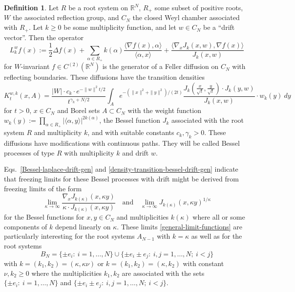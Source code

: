 \documentclass[reqno]{amsart}
\theoremstyle{plain}
\theoremstyle{definition}
\newtheorem{definition}[theorem]{Definition}
\numberwithin{equation}{section}
\begin{document}
\begin{definition}\label{def-bessel-p-drift}
  Let $R$ be a root system on $\mathbb R^N$, $R_+$ some subset of positive roots, $W$ the associated reflection group,
  and $C_N$ the closed Weyl chamber associated with $R_+$. Let $ k\ge0$ be some multiplicity function, and
 let $w\in C_N$ be a ``drift vector''. Then the operator
   \begin{equation}\label{Bessel-laplace-drift-gen}
  L_k^w f(x):= \frac{1}{2}\Delta f(x)  + \sum_{\alpha\in R_+}
k(\alpha)
\frac{\langle\nabla f(x),\alpha\rangle}{\langle\alpha ,x\rangle}+\frac{\langle \nabla_x J_k(x,w), \nabla f(x)\rangle }{J_k(x,w)}
   \end{equation}
   for $W$-invariant $f\in C^{(2)}(\mathbb R^N)$ is the generator of a Feller diffusion on $C_N$ with reflecting boundaries.
   These diffusions have the transition densities
   \begin{equation}\label{density-transition-bessel-drift-gen}
  K_t^{w,k}(x,A)=\frac{|W|\cdot c_k\cdot e^{-\|w\|^2 t/2}}{t^{\gamma_k+N/2}} \int_A e^{-(\|x\|^2+\|y\|^2)/(2t)}
 \frac{ J_k(\frac{x}{\sqrt{t}}, \frac{y}{\sqrt{t}}) \cdot J_k(y,w)}{J_k(x,w)}
\cdot w_k(y)\> dy
\end{equation}
   for $t>0$, $x\in C_N$ and  Borel sets $A\subset  C_N$ with the weight function
   $w_k(y) := \prod_{\alpha\in R_+} |\langle\alpha,y\rangle|^{2k(\alpha)}$,
    the Bessel function $J_k$ associated with the root system $R$ and multiplicity $k$, and with suitable constants $c_k,\gamma_k>0$.
These diffusions  have modifications with continuous paths. They
will be called Bessel processes of type $R$ with multiplicity $k$ and drift $w$.   
\end{definition}

Eqs.~\eqref{Bessel-laplace-drift-gen} and \eqref{density-transition-bessel-drift-gen}
indicate that freezing limits for
these Bessel processes with drift might be derived from
freezing limits of the form
\begin{equation}\label{general-limit-functions}
  \lim_{\kappa\to\infty}\frac{\nabla_x J_{k(\kappa)}(x,\kappa y) }{\kappa \cdot J_{k(\kappa)}(x,\kappa y)}
\quad\text{and}\quad \lim_{\kappa\to\infty} J_{k(\kappa)}(x,\kappa y)^{1/\kappa}\end{equation}
for the Bessel functions  for  $x,y\in C_N$ and  multiplicities $k(\kappa)$  where all or some components of $k$ depend
linearly on $\kappa$.
These limits \eqref{general-limit-functions} are particularly interesting for the root systems $A_{N-1}$ with $k=\kappa$ as well as for
the root systems
$$B_N=\{\pm e_i:\> i=1,\dots,N\}\cup\{\pm e_i\pm e_j:\> i,j=1,\dots,N; \> i<j\}$$
 with $k=(k_1,k_2)=(\kappa,\kappa\nu)$  or  $k=(k_1,k_2)=(\kappa,k_2)$
 with constant $\nu,k_2\ge0$ where the multiplicities $k_1,k_2$ are associated with the sets 
$\{\pm e_i:\> i=1,\dots,N\}$ and $\{\pm e_i\pm e_j:\> i,j=1,\dots,N; \> i<j\}$.
\end{document}
